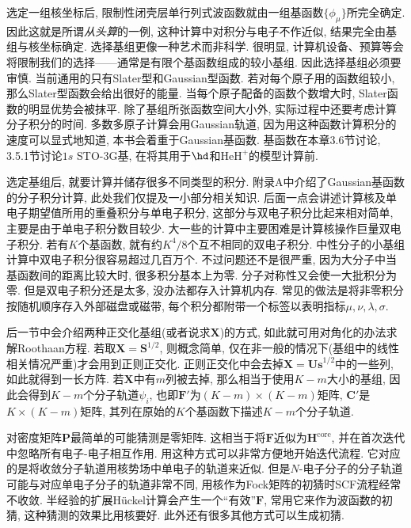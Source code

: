 选定一组核坐标后, 
限制性闭壳层单行列式波函数就由一组基函数$\{\phi_\mu\}$所完全确定. 
因此这就是所谓\emph{从头算}的一例, 
这种计算中对积分与电子\ha 不作近似, 
结果完全由基组与核坐标确定. 
选择基组更像一种艺术而非科学. 
很明显, 
计算机设备、预算等会将限制我们的选择——通常是有限个基函数组成的较小基组. 
因此选择基组必须要审慎. 
当前通用的只有Slater型和Gaussian型函数. 
若对每个原子用的函数组较小, 
那么Slater型函数会给出很好的能量. 
当每个原子配备的函数个数增大时, 
Slater函数的明显优势会被抹平. 
除了基组所张函数空间大小外, 
实际过程中还要考虑计算分子积分的时间. 
多数多原子计算会用Gaussian轨道, 
因为用这种函数计算积分的速度可以显式地知道, 
本书会着重于Gaussian基函数. 
基函数在本章3.6节讨论, 
3.5.1节讨论$1s$ STO-3G基, 
在将其用于$\hd$和$\mathrm{HeH}^+$的模型计算前.


选定基组后, 
就要计算并储存很多不同类型的积分. 
附录A中介绍了Gaussian基函数的分子积分计算, 
此处我们仅提及一小部分相关知识. 
后面一点会讲述计算核\ha 及单电子期望值所用的重叠积分与单电子积分, 
这部分与双电子积分比起来相对简单, 
主要是由于单电子积分数目较少. 
大一些的计算中主要困难是计算核操作巨量双电子积分. 
若有$K$个基函数, 
就有约$K^4/8$个互不相同的双电子积分. 
中性分子的小基组计算中双电子积分很容易超过几百万个. 
不过问题还不是很严重, 
因为大分子中当基函数间的距离比较大时, 
很多积分基本上为零. 
分子对称性又会使一大批积分为零. 
但是双电子积分还是太多, 
没办法都存入计算机内存. 
常见的做法是将非零积分按随机顺序存入外部磁盘或磁带, 
每个积分都附带一个标签以表明指标$\mu,\nu,\lambda,\sigma$.


后一节中会介绍两种正交化基组(或者说求$\mathbf{X}$)的方式, 
如此就可用对角化的办法求解Roothaan方程. 
若取$\mathbf{X=S}^{1/2}$, 
则概念简单, 
仅在非一般的情况下(基组中的线性相关情况严重)才会用到正则正交化. 
正则正交化中会去掉$\mathbf{X=Us}^{1/2}$中的一些列, 
如此就得到一长方阵. 
若$\mathbf{X}$中有$m$列被去掉, 
那么相当于使用$K-m$大小的基组, 
因此会得到$K-m$个分子轨道$\psi_i$, 
也即$\mathbf{F'}$为$(K-m)\times(K-m)$矩阵, 
$\mathbf{C'}$是$K\times(K-m)$矩阵, 
其列在原始的$K$个基函数下描述$K-m$个分子轨道.


对密度矩阵$\mathbf{P}$最简单的可能猜测是零矩阵. 
这相当于将$\mathbf{F}$近似为$\mathbf{H}^\mathrm{core}$, 
并在首次迭代中忽略所有电子-电子相互作用. 
用这种方式可以非常方便地开始迭代流程. 
它对应的是将收敛分子轨道用核势场中单电子的轨道来近似. 
但是$N$-电子分子的分子轨道可能与对应单电子分子的轨道非常不同, 
用核\ha 作为Fock矩阵的初猜时SCF流程经常不收敛. 
半经验的扩展H\"uckel计算会产生一个``有效''$\mathbf{F}$, 
常用它来作为波函数的初猜, 
这种猜测的效果比用核\ha 要好. 
此外还有很多其他方式可以生成初猜.


